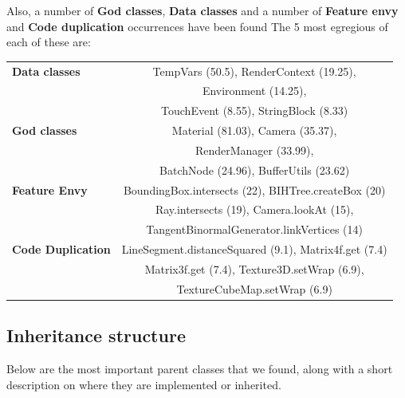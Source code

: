 \documentclass[a4paper, 10pt]{article}
\begin{document}

Also, a number of \textbf{God classes}, %
\textbf{Data classes} and a number of \textbf{Feature envy} and
\textbf{Code duplication} occurrences have been found
The 5 most egregious of each of these are:

\begin{tabular}{| l || c |}
  \hline
  \textbf{Data classes}     & TempVars (50.5), RenderContext (19.25), \\
                            & Environment (14.25), \\
                            & TouchEvent (8.55), StringBlock (8.33) \\
  \hline
  \textbf{God classes}      & Material (81.03), Camera (35.37), \\
                            & RenderManager (33.99), \\
                            & BatchNode (24.96), BufferUtils (23.62) \\
  \hline
  \textbf{Feature Envy}     & BoundingBox.intersects (22), BIHTree.createBox (20) \\
                            & Ray.intersects (19), Camera.lookAt (15), \\
                            & TangentBinormalGenerator.linkVertices (14) \\
  \hline
  \textbf{Code Duplication} & LineSegment.distanceSquared (9.1), Matrix4f.get (7.4) \\
                            & Matrix3f.get (7.4), Texture3D.setWrap (6.9), \\
                            & TextureCubeMap.setWrap (6.9) \\
  \hline
\end{tabular}


\newpage
\subsection{Inheritance structure}
\label{sec:inheritance_structure}
Below are the most important parent classes that we found,
along with a short description on where they are implemented or inherited.
\end{document}
